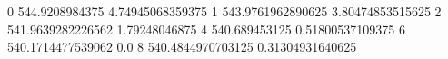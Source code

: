 0 544.9208984375 4.74945068359375
1 543.9761962890625 3.80474853515625
2 541.9639282226562 1.79248046875
4 540.689453125 0.51800537109375
6 540.1714477539062 0.0
8 540.4844970703125 0.31304931640625
